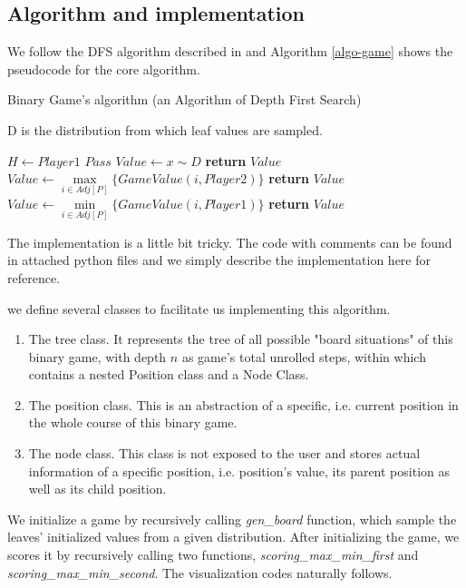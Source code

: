 \documentclass[a4paper,english]{article}
\begin{document}
\begin{spacing}{1.4}
\section{Algorithm and implementation}
We follow the DFS algorithm described in \cite{SpencerGame} and Algorithm \ref{algo-game} shows the pseudocode for the core algorithm.

\begin{algorithm}
\caption{Binary Game’s algorithm (an Algorithm of Depth First Search)} \label{algo-game}
D is the distribution from which leaf values are sampled.
\begin{algorithmic}[1]
\State $H\gets Player1$
\Else
\State $Pass$
\EndIf
{}
\State $Value\gets x \sim D$
\State \textbf{return} $Value$
\Else
{}
\State $Value \gets \max\limits_{ i \in Adj[P]}\{Game Value(i,Player2)\}$ 
\State \textbf{return} $Value$
\Else
\State $Value \gets \min\limits_{ i \in Adj[P]}\{Game Value(i,Player1)\}$ 
\State \textbf{return} $Value$
\EndIf
\EndIf
\EndProcedure
\end{algorithmic}
\end{algorithm}

The implementation is a little bit tricky. The code with comments can be found in attached python files and we simply describe the implementation here for reference.

we define several classes to facilitate us implementing this algorithm.
\begin{enumerate}
  \item The tree class. It represents the tree of all possible "board situations" of this binary game, with depth $n$ as game's total unrolled steps, within which contains a nested Position class and a Node Class.
  \item The position class. This is an abstraction of a specific, i.e. current position in the whole course of this binary game.
  \item The node class. This class is not exposed to the user and stores actual information of a specific position, i.e. position's value, its parent position as well as its child position.
\end{enumerate}

We initialize a game by recursively calling \textit{gen\_board} function, which sample the leaves' initialized values from a given distribution. After initializing the game, we scores it by recursively calling two functions, \textit{scoring\_max\_min\_first} and \textit{scoring\_max\_min\_second}. The visualization codes naturally follows.


\end{spacing}
\end{document}
